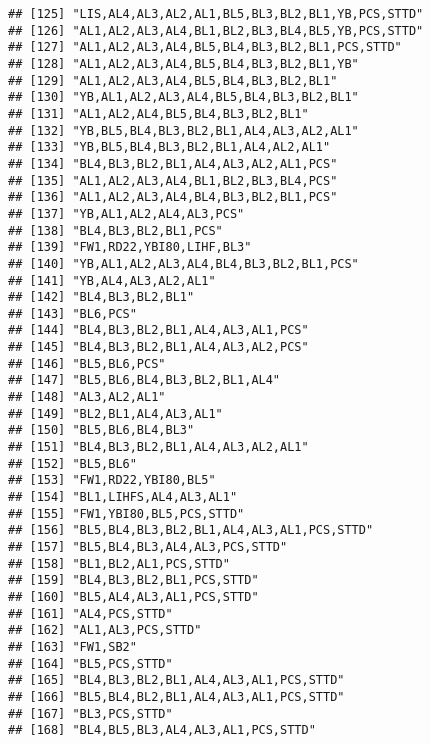 \documentclass[
]{article}
\begin{document}
\begin{verbatim}
## [125] "LIS,AL4,AL3,AL2,AL1,BL5,BL3,BL2,BL1,YB,PCS,STTD" 
## [126] "AL1,AL2,AL3,AL4,BL1,BL2,BL3,BL4,BL5,YB,PCS,STTD" 
## [127] "AL1,AL2,AL3,AL4,BL5,BL4,BL3,BL2,BL1,PCS,STTD"    
## [128] "AL1,AL2,AL3,AL4,BL5,BL4,BL3,BL2,BL1,YB"          
## [129] "AL1,AL2,AL3,AL4,BL5,BL4,BL3,BL2,BL1"             
## [130] "YB,AL1,AL2,AL3,AL4,BL5,BL4,BL3,BL2,BL1"          
## [131] "AL1,AL2,AL4,BL5,BL4,BL3,BL2,BL1"                 
## [132] "YB,BL5,BL4,BL3,BL2,BL1,AL4,AL3,AL2,AL1"          
## [133] "YB,BL5,BL4,BL3,BL2,BL1,AL4,AL2,AL1"              
## [134] "BL4,BL3,BL2,BL1,AL4,AL3,AL2,AL1,PCS"             
## [135] "AL1,AL2,AL3,AL4,BL1,BL2,BL3,BL4,PCS"             
## [136] "AL1,AL2,AL3,AL4,BL4,BL3,BL2,BL1,PCS"             
## [137] "YB,AL1,AL2,AL4,AL3,PCS"                          
## [138] "BL4,BL3,BL2,BL1,PCS"                             
## [139] "FW1,RD22,YBI80,LIHF,BL3"                         
## [140] "YB,AL1,AL2,AL3,AL4,BL4,BL3,BL2,BL1,PCS"          
## [141] "YB,AL4,AL3,AL2,AL1"                              
## [142] "BL4,BL3,BL2,BL1"                                 
## [143] "BL6,PCS"                                         
## [144] "BL4,BL3,BL2,BL1,AL4,AL3,AL1,PCS"                 
## [145] "BL4,BL3,BL2,BL1,AL4,AL3,AL2,PCS"                 
## [146] "BL5,BL6,PCS"                                     
## [147] "BL5,BL6,BL4,BL3,BL2,BL1,AL4"                     
## [148] "AL3,AL2,AL1"                                     
## [149] "BL2,BL1,AL4,AL3,AL1"                             
## [150] "BL5,BL6,BL4,BL3"                                 
## [151] "BL4,BL3,BL2,BL1,AL4,AL3,AL2,AL1"                 
## [152] "BL5,BL6"                                         
## [153] "FW1,RD22,YBI80,BL5"                              
## [154] "BL1,LIHFS,AL4,AL3,AL1"                           
## [155] "FW1,YBI80,BL5,PCS,STTD"                          
## [156] "BL5,BL4,BL3,BL2,BL1,AL4,AL3,AL1,PCS,STTD"        
## [157] "BL5,BL4,BL3,AL4,AL3,PCS,STTD"                    
## [158] "BL1,BL2,AL1,PCS,STTD"                            
## [159] "BL4,BL3,BL2,BL1,PCS,STTD"                        
## [160] "BL5,AL4,AL3,AL1,PCS,STTD"                        
## [161] "AL4,PCS,STTD"                                    
## [162] "AL1,AL3,PCS,STTD"                                
## [163] "FW1,SB2"                                         
## [164] "BL5,PCS,STTD"                                    
## [165] "BL4,BL3,BL2,BL1,AL4,AL3,AL1,PCS,STTD"            
## [166] "BL5,BL4,BL2,BL1,AL4,AL3,AL1,PCS,STTD"            
## [167] "BL3,PCS,STTD"                                    
## [168] "BL4,BL5,BL3,AL4,AL3,AL1,PCS,STTD"                

\end{verbatim}
\end{document}
